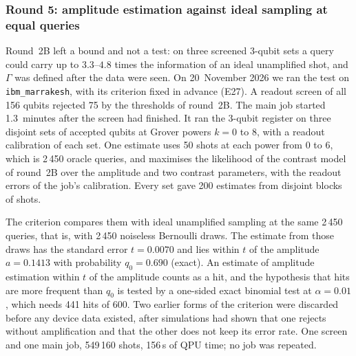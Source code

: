\documentclass[11pt,a4paper]{article}
\begin{document}
\subsubsection{Round 5: amplitude estimation against ideal sampling at equal queries}
\label{sec:res-hw5}

Round~2B left a bound and not a test: on three screened 3-qubit sets a
query could carry up to $3.3$--$4.8$ times the information of an ideal
unamplified shot, and $\Gamma$ was defined after the data were seen. On
20~November 2026 we ran the test on \texttt{ibm\_marrakesh}, with its
criterion fixed in advance (E27). A readout screen of all 156 qubits
rejected 75 by the thresholds of round~2B. The main job started
1.3~minutes after the screen had finished. It ran the 3-qubit register on
three disjoint sets of accepted qubits at Grover powers $k = 0$ to $8$, with
a readout calibration of each set. One estimate uses 50 shots at each power
from 0 to 6, which is 2\,450 oracle queries, and maximises the likelihood of
the contrast model of round~2B over the amplitude and two contrast
parameters, with the readout errors of the job's calibration. Every set
gave 200 estimates from disjoint blocks of shots.

The criterion compares them with ideal unamplified sampling at the same
2\,450 queries, that is, with 2\,450 noiseless Bernoulli draws. The estimate
from those draws has the standard error $t = 0.0070$ and lies within $t$ of
the amplitude $a = 0.1413$ with probability $q_0 = 0.690$ (exact). An
estimate of amplitude estimation within $t$ of the amplitude counts as a
hit, and the hypothesis that hits are more frequent than $q_0$ is tested by
a one-sided exact binomial test at $\alpha = 0.01$, which needs 441 hits of
600. Two earlier forms of the criterion were discarded before any device
data existed, after simulations had shown that one rejects without
amplification and that the other does not keep its error rate. One screen
and one main job, 549\,160 shots, 156\,s of QPU time; no job was repeated.
\end{document}
